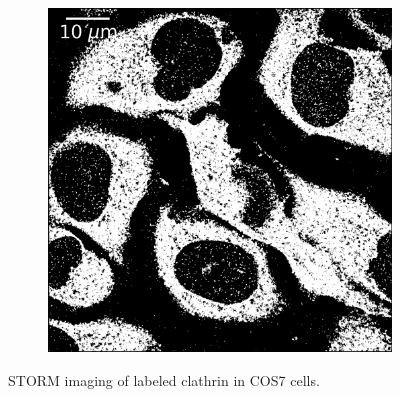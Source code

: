 \begin{figure}[htbp]
\begin{subfigure}{0.49\textwidth}
        \includegraphics[width=\textwidth]{figures/clathrin_image12.png}
        \caption{}
    \end{subfigure}
    \caption{STORM imaging of labeled clathrin in COS7 cells.}
    \label{fig:extra_clathrin_images}
\end{figure}